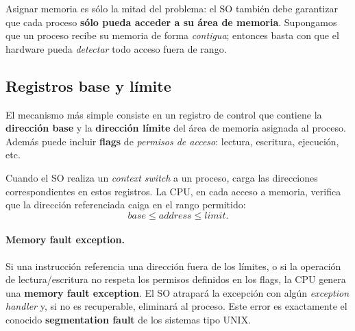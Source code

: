 \documentclass[11pt,a4paper]{article}
\begin{document}
Asignar memoria es sólo la mitad del problema: el SO también debe
garantizar que cada proceso \textbf{sólo pueda acceder a su área de
memoria}. Supongamos que un proceso recibe su memoria de forma
\emph{contigua}; entonces basta con que el hardware pueda
\emph{detectar} todo acceso fuera de rango.

\subsection{Registros base y límite}

El mecanismo más simple consiste en un registro de control que contiene
la \textbf{dirección base} y la \textbf{dirección límite} del área de
memoria asignada al proceso. Además puede incluir \textbf{flags} de
\emph{permisos de acceso}: lectura, escritura, ejecución, etc.

\begin{center}
\end{center}

Cuando el SO realiza un \emph{context switch} a un proceso, carga las
direcciones correspondientes en estos registros. La CPU, en cada acceso
a memoria, verifica que la dirección referenciada caiga en el rango
permitido:
\[
\textit{base} \leq \textit{address} \leq \textit{limit}.
\]

\paragraph{Memory fault exception.}
Si una instrucción referencia una dirección fuera de los límites, o si
la operación de lectura/escritura no respeta los permisos definidos en
los flags, la CPU genera una \textbf{memory fault exception}. El SO
atrapará la excepción con algún \emph{exception handler} y, si no es
recuperable, eliminará al proceso. Este error es exactamente el
conocido \textbf{segmentation fault} de los sistemas tipo UNIX.
\end{document}
